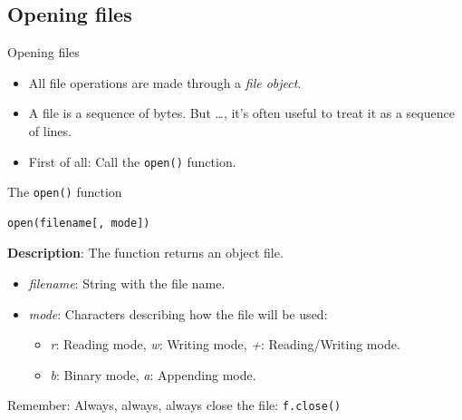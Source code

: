 \documentclass[10pt,compress]{beamer} %
\begin{document}
\subsection{Opening files}
\begin{frame}[fragile]{Opening files}{}
	\begin{itemize}
	\item \small{All file operations are made through a \textit{file object}.}
	\item \small{A file is a sequence of bytes. But \ldots, it's often useful to treat it as a sequence of lines.} %
	\item \small{First of all: Call the \texttt{open()} function.}
	\end{itemize}

	\begin{block}{The \texttt{open()} function}
\begin{verbatim}
open(filename[, mode])	
\end{verbatim}
	\vspace{-0.2cm}
	\textbf{Description}: The function returns an object file.\\
	\vspace{-0.2cm}
	\begin{itemize}
	\item \textit{filename}: String with the file name.
	\item \textit{mode}: Characters describing how the file will be used:
		\begin{itemize}
		\item \textit{r}: Reading mode, \textit{w}: Writing mode,  \textit{+}:  Reading/Writing mode. %
		\item \textit{b}: Binary mode, \textit{a}: Appending mode.
		\end{itemize}
	\end{itemize}
	\end{block}
	\small{\alert{Remember}: Always, always, always close the file: \texttt{f.close()}}
\end{frame}
\end{document}
